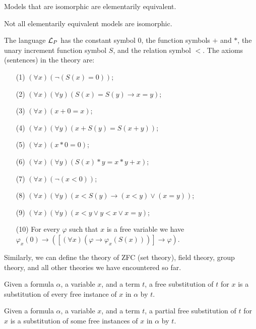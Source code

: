 \documentclass[11pt,a4paper]{article}
\renewcommand{\implies}{\rightarrow}
\begin{document}
  \begin{proposition}
    Models that are isomorphic are elementarily equivalent.
  \end{proposition}
  \begin{remark}
    Not all elementarily equivalent models are isomorphic.
  \end{remark}

  \begin{example}
    The language $\mathcal{L}_P$ has the constant symbol $0$, the function symbols
    $+$ and $*$, the unary increment function symbol $S$, and the relation
    symbol $<$. The axioms (sentences) in the theory are:
    \begin{enumerate}
      \item [(1)] $(\forall x)(\neg (S(x) = 0))$;
      \item [(2)] $(\forall x)(\forall y)(S(x) = S(y) \implies x =y)$;
      \item [(3)] $(\forall x)(x + 0 = x)$;
      \item [(4)] $(\forall x)(\forall y)(x + S(y) = S(x + y))$;
      \item [(5)] $(\forall x)(x * 0 = 0)$;
      \item [(6)] $(\forall x)(\forall y)(S(x) * y = x * y + x)$;
      \item [(7)] $(\forall x)(\neg (x < 0))$;
      \item [(8)] $(\forall x)(\forall y)
        (x < S(y) \implies (x < y) \lor (x=y))$;
      \item [(9)] $(\forall x)(\forall y)(x < y \lor y < x \lor x = y)$;
      \item [(10)] For every $\varphi$ such that $x$ is a free variable 
        we have $\varphi_x(0) \implies \left(\left[(\forall x)
        (\varphi \implies \varphi_x(S(x)))\right] \implies \varphi \right)$.
    \end{enumerate}
  \end{example}

  Similarly, we can define the theory of ZFC (set theory), field theory,
  group theory, and all other theories we have encountered so far.

  \begin{definition}
    Given a formula $\alpha$, a variable $x$, and a term $t$,
    a free substitution of $t$ for $x$ is a substitution of every
    free instance of $x$ in $\alpha$ by $t$.
  \end{definition}

  \begin{definition}
    Given a formula $\alpha$, a variable $x$, and a term $t$,
    a partial free substitution of $t$ for $x$ is a substitution of some
    free instances of $x$ in $\alpha$ by $t$.
  \end{definition}
\end{document}
